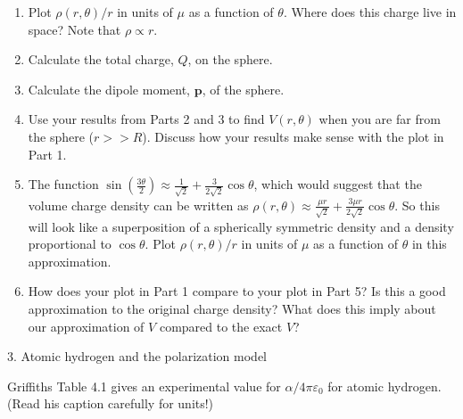 \documentclass[11pt]{article}
\def\tightlist{}
\begin{document}
\begin{enumerate}
\def\labelenumi{\arabic{enumi}.}
\tightlist
\item
  Plot \(\rho(r,\theta)/r\) in units of \(\mu\) as a function of
  \(\theta\). Where does this charge live in space? Note that
  \(\rho \propto r\).
\item
  Calculate the total charge, \(Q\), on the sphere.
\item
  Calculate the dipole moment, \(\mathbf{p}\), of the sphere.
\item
  Use your results from Parts 2 and 3 to find \(V(r,\theta)\) when you
  are far from the sphere (\(r>>R\)). Discuss how your results make
  sense with the plot in Part 1.
\item
  The function
  \(\sin\left(\frac{3\theta}{2}\right) \approx \frac{1}{\sqrt{2}} + \frac{3}{2\sqrt{2}}\cos\theta\),
  which would suggest that the volume charge density can be written as
  \(\rho(r,\theta) \approx \frac{\mu r}{\sqrt{2}} + \frac{3\mu r}{2\sqrt{2}} \cos \theta\).
  So this will look like a superposition of a spherically symmetric
  density and a density proportional to \(\cos \theta\). Plot
  \(\rho(r,\theta)/r\) in units of \(\mu\) as a function of \(\theta\)
  in this approximation.
\item
  How does your plot in Part 1 compare to your plot in Part 5? Is this a
  good approximation to the original charge density? What does this
  imply about our approximation of \(V\) compared to the exact \(V\)?
\end{enumerate}

{\Large 3. Atomic hydrogen and the polarization
model}\label{atomic-hydrogen-and-the-polarization-model}

Griffiths Table 4.1 gives an experimental value for
\(\alpha/4\pi\varepsilon_0\) for atomic hydrogen. (Read his caption
carefully for units!)
\end{document}
